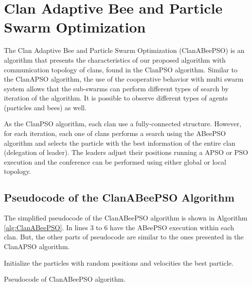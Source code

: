 \section{Clan Adaptive Bee and Particle Swarm Optimization}
The Clan Adaptive Bee and Particle Swarm Optimization (ClanABeePSO) is an algorithm that presents the characteristics of our proposed algorithm with communication topology of clans, found in the ClanPSO algorithm. Similar to the ClanAPSO algorithm, the use of the cooperative behavior with multi swarm system allows that the sub-swarms can perform different types of search by iteration of the algorithm. It is possible to observe different types of agents (particles and bees) as well.

As the ClanPSO algorithm, each clan use a fully-connected structure. However, for each iteration, each one of clans performs a search using the ABeePSO algorithm and selects the particle with the best information of the entire clan (delegation of leader). The leaders adjust their positions running a APSO or PSO execution and the conference can be performed using either global or local topology.

\subsection{Pseudocode of the ClanABeePSO Algorithm}
The simplified pseudocode of the ClanABeePSO algorithm is shown in Algorithm \ref{alg:ClanABeePSO}. In lines 3 to 6 have the ABeePSO execution within each clan. But, the other parts of pseudocode are similar to the ones presented in the ClanAPSO algorithm.

\begin{algorithm}[!h]
    Initialize the particles with random positions and velocities\;
    \Return the best particle.
    \caption{Pseudocode of ClanABeePSO algorithm.}
    \label{alg:ClanABeePSO}
\end{algorithm}
\pagebreak
